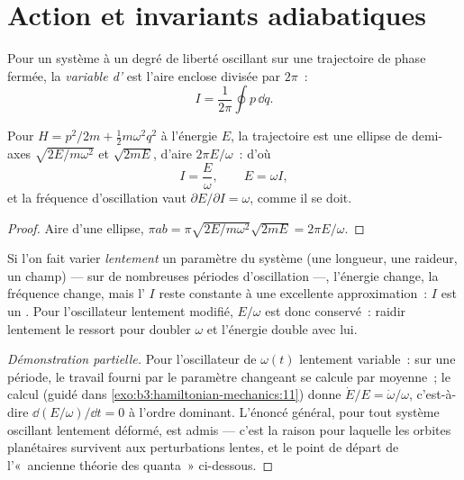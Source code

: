 \section{Action et invariants adiabatiques}

\begin{definition}\label{def:b3:hamiltonian-mechanics:action-variable}
Pour un système à un degré de liberté oscillant sur une trajectoire de
phase fermée, la \emph{variable d'} est l'aire enclose divisée
par $2\pi$~:
\[
I = \frac{1}{2\pi}\oint p\,\dd q .
\]
\end{definition}

\begin{proposition}\label{prop:b3:hamiltonian-mechanics:sho-action}
Pour $H = p^2/2m + \tfrac12 m\omega^2q^2$ à l'énergie $E$, la
trajectoire est une ellipse de demi-axes $\sqrt{2E/m\omega^2}$ et
$\sqrt{2mE}$, d'aire $2\pi E/\omega$~: d'où
\[
I = \frac{E}{\omega} , \qquad E = \omega I ,
\]
et la fréquence d'oscillation vaut $\partial E/\partial I = \omega$,
comme il se doit.
\end{proposition}

\begin{proof}
Aire d'une ellipse, $\pi ab = \pi\sqrt{2E/m\omega^2}\sqrt{2mE} =
2\pi E/\omega$.
\end{proof}

\begin{proposition}\label{prop:b3:hamiltonian-mechanics:adiabatic}
Si l'on fait varier \emph{lentement} un paramètre du système (une
longueur, une raideur, un champ) --- sur de nombreuses périodes
d'oscillation ---, l'énergie change, la fréquence change, mais
l' $I$ reste constante à une excellente approximation~: $I$ est
un \emph{}. Pour l'oscillateur lentement modifié,
$E/\omega$ est donc conservé~: raidir lentement le ressort pour
doubler $\omega$ et l'énergie double avec lui.
\end{proposition}

\begin{proof}[Démonstration partielle]
Pour l'oscillateur de $\omega(t)$ lentement variable~: sur une période,
le travail fourni par le paramètre changeant se calcule par moyenne~;
le calcul (guidé dans \cref{exo:b3:hamiltonian-mechanics:11}) donne
$\dot E/E = \dot\omega/\omega$, c'est-à-dire $\dd(E/\omega)/\dd t = 0$
à l'ordre dominant. L'énoncé général, pour tout système oscillant
lentement déformé, est admis --- c'est la raison pour laquelle les
orbites planétaires survivent aux perturbations lentes, et le point de
départ de l'«~ancienne théorie des quanta~» ci-dessous.
\end{proof}

